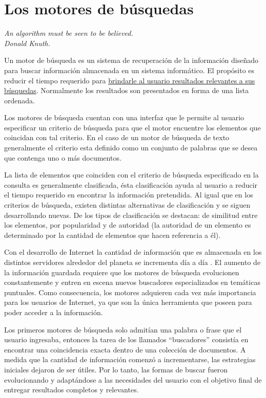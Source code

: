 \section{Los motores de búsquedas}
{\begin{small}%
\begin{flushright}%
\it An algorithm must be seen to be believed.\\Donald Knuth.
\end{flushright}%
\end{small}%
\vspace{.5cm}}

Un motor de búsqueda es un sistema de recuperación de la información diseñado para buscar información almacenada en un sistema informático. El propósito es reducir el tiempo requerido para \underline{brindarle al usuario resultados relevantes a sus búsquedas}. Normalmente los resultados son presentados en forma de una lista ordenada.

Los motores de búsqueda cuentan con una interfaz que le permite al usuario especificar un criterio de búsqueda para que el motor encuentre los elementos que coincidan con tal criterio. En el caso de un motor de búsqueda de texto generalmente el criterio esta definido como un conjunto de palabras que se desea que contenga uno o más documentos.

La lista de elementos que coinciden con el criterio de búsqueda especificado en la consulta es generalmente clasificada, ésta clasificación ayuda al usuario a reducir el tiempo requerido en encontrar la información pretendida. Al igual que en los criterios de búsqueda, existen distintas alternativas de clasificación y se siguen desarrollando nuevas. De los tipos de clasificación se destacan: de similitud entre los elementos, por popularidad y de autoridad (la autoridad de un elemento es determinado por la cantidad de elementos que hacen referencia a él).

Con el desarrollo de Internet la cantidad de información que es almacenada en los distintos servidores alrededor del planeta se incrementa día a día \cite{url:internetUsers}. El aumento de la información guardada requiere que los motores de búsqueda evolucionen constantemente y entren en escena nuevos buscadores especializados en temáticas puntuales. Como consecuencia, los motores adquieren cada vez más importancia para los usuarios de Internet, ya que son la única herramienta que poseen para poder acceder a la información.

Los primeros motores de búsqueda solo admitían una palabra o frase que el usuario ingresaba, entonces la tarea de los llamados ``buscadores'' consistía en encontrar una coincidencia exacta dentro de una colección de documentos. A medida que la cantidad de información comenzó a incrementarse, las estrategias iniciales dejaron de ser útiles. Por lo tanto, las formas de buscar fueron evolucionando y adaptándose a las necesidades del usuario con el objetivo final de entregar resultados completos y relevantes.

